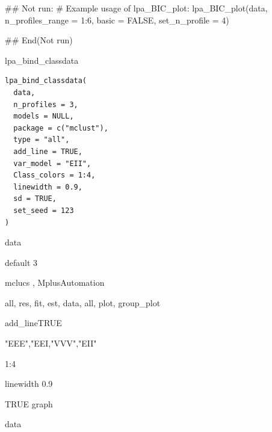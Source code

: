 \documentclass[a4paper]{book}
\begin{document}
%
\begin{Examples}
\begin{ExampleCode}
\#\# Not run: 
# Example usage of lpa_BIC_plot:
lpa_BIC_plot(data, n_profiles_range = 1:6, basic = FALSE, set_n_profile = 4)

## End(Not run)
\end{ExampleCode}
\end{Examples}
%
\begin{Description}
lpa\_bind\_classdata
\end{Description}
%
\begin{Usage}
\begin{verbatim}
lpa_bind_classdata(
  data,
  n_profiles = 3,
  models = NULL,
  package = c("mclust"),
  type = "all",
  add_line = TRUE,
  var_model = "EII",
  Class_colors = 1:4,
  linewidth = 0.9,
  sd = TRUE,
  set_seed = 123
)
\end{verbatim}
\end{Usage}
%
\begin{Arguments}
\begin{ldescription}
\item[\code{data}] data

\item[\code{n\_profiles}] default 3

\item[\code{package}] mclucs , MplusAutomation

\item[\code{type}] all, res, fit, est, data, all, plot, group\_plot

\item[\code{add\_line}] add\_lineTRUE

\item[\code{var\_model}] "EEE","EEI,"VVV","EII"

\item[\code{Class\_colors}] 1:4

\item[\code{linewidth}] linewidth 0.9

\item[\code{sd}] TRUE graph
\end{ldescription}
\end{Arguments}
%
\begin{Value}
data
\end{Value}
%
\end{document}
